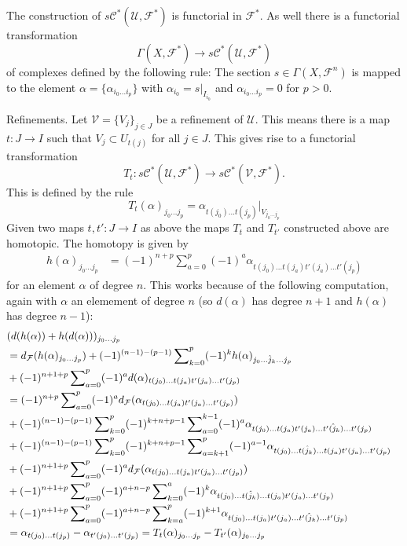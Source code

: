 \medskip\noindent
The construction of $s{\mathcal C}^*({\mathcal U}, {\mathcal F}^*)$
is functorial in ${\mathcal F}^*$. As well there is a functorial
transformation
$$
\Gamma(X, {\mathcal F}^*)
\longrightarrow
s{\mathcal C}^*({\mathcal U}, {\mathcal F}^*)
$$
of complexes defined by the following rule: The section
$s\in \Gamma(X, {\mathcal F}^n)$
is mapped to the element $\alpha = \{\alpha_{i_0\ldots i_p}\}$
with $\alpha_{i_0} = s|_{I_{i_0}}$ and $\alpha_{i_0\ldots i_p} = 0$
for $p>0$.

\medskip\noindent
Refinements. Let ${\mathcal V} = \{ V_j \}_{j\in J}$ be a
refinement of ${\mathcal U}$. This means there is a map $t: J \to I$
such that $V_j \subset U_{t(j)}$ for all $j\in J$. This gives
rise to a functorial transformation
$$
T_t : s{\mathcal C}^*({\mathcal U}, {\mathcal F}^*)
\longrightarrow
s{\mathcal C}^*({\mathcal V}, {\mathcal F}^*).
$$
This is defined by the rule
$$
T_t(\alpha)_{j_0\ldots j_p}
=
\alpha_{t(j_0)\ldots t(j_p)}|_{V_{j_0\ldots j_p}}
$$
Given two maps $t, t' : J \to I$ as above the maps
$T_t$ and $T_{t'}$ constructed above are homotopic.
The homotopy is given by
\begin{align*}
h(\alpha)_{j_0\ldots j_p}
& =
(-1)^{n + p}
\sum\nolimits_{a = 0}^{p}
(-1)^a
\alpha_{t(j_0)\ldots t(j_a) t'(j_a) \ldots t'(j_p)}
\end{align*}
for an element $\alpha$ of degree $n$. This works
because of the following computation, again with
$\alpha$ an elemement of degree $n$ (so $d(\alpha)$
has degree $n + 1$ and $h(\alpha)$ has degree $n-1$):
\begin{align*}
& (
d(h(\alpha)) + h(d(\alpha))
)_{j_0\ldots j_p}
\cr
& =
d_{\mathcal F}(h(\alpha)_{j_0\ldots j_p})
+
(-1)^{(n-1)-(p-1)}
\sum\nolimits_{k = 0}^p
(-1)^k
h(\alpha)_{j_0\ldots\hat j_k\ldots j_p}
\cr
& +
(-1)^{n + 1 + p}
\sum\nolimits_{a = 0}^p
(-1)^a
d(\alpha)_{t(j_0)\ldots t(j_a) t'(j_a) \ldots t'(j_p)}
\cr
& =
(-1)^{n + p}
\sum\nolimits_{a = 0}^p
(-1)^a
d_{\mathcal F}(\alpha_{t(j_0)\ldots t(j_a) t'(j_a) \ldots t'(j_p)})
\cr
& +
(-1)^{(n-1)-(p-1)}
\sum\nolimits_{k = 0}^p
(-1)^{k + n + p-1}
\sum\nolimits_{a = 0}^{k-1}
(-1)^a
\alpha_{t(j_0)\ldots t(j_a)t'(j_a)\ldots\hat{t'(j_k)}\ldots t'(j_p)}
\cr
& +
(-1)^{(n-1)-(p-1)}
\sum\nolimits_{k = 0}^p
(-1)^{k + n + p-1}
\sum\nolimits_{a = k + 1}^p
(-1)^{a-1}
\alpha_{t(j_0)\ldots\hat{t(j_k)}\ldots t(j_a)t'(j_a)\ldots t'(j_p)}
\cr
& +
(-1)^{n + 1 + p}
\sum\nolimits_{a = 0}^p
(-1)^a
d_{\mathcal F}(\alpha_{t(j_0)\ldots t(j_a) t'(j_a) \ldots t'(j_p)})
\cr
& +
(-1)^{n + 1 + p}
\sum\nolimits_{a = 0}^p
(-1)^{a + n-p}
\sum\nolimits_{k = 0}^a
(-1)^k
\alpha_{t(j_0)\ldots \hat{t(j_k)}\ldots t(j_a)t'(j_a)\ldots t'(j_p)}
\cr
& +
(-1)^{n + 1 + p}
\sum\nolimits_{a = 0}^p
(-1)^{a + n-p}
\sum\nolimits_{k = a}^p
(-1)^{k + 1}
\alpha_{t(j_0)\ldots t(j_a)t'(j_a)\ldots \hat{t'(j_k)}\ldots t'(j_p)}
\cr
& =
\alpha_{t(j_0)\ldots t(j_p)} - \alpha_{t'(j_0)\ldots t'(j_p)}
=
T_t(\alpha)_{j_0\ldots j_p} - T_{t'}(\alpha)_{j_0\ldots j_p}
\end{align*}
